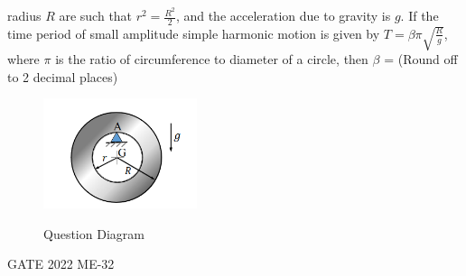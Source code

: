 \begin{enumerate}[label=\thechapter.\arabic*,ref=\thechapter.\theenumi]
radius $R$ are such that $r^2 = \frac{R^2}{2}$, and the acceleration due to gravity is $g$. If the
time period of small amplitude simple harmonic motion is given by $T = \beta \pi \sqrt{\frac{R}{g}}$,
where $\pi$ is the ratio of circumference to diameter of a circle, then $\beta$ =  (Round off to 2 decimal places)
\begin{figure}[h]
    \includegraphics[width=0.4\textwidth]{2022/ME/32/figs/11027_GATE_ME_32.png}\label{11027_GATE_ME_32}
    \caption{Question Diagram}
\end{figure}
\hfill{GATE 2022 ME-32}
\\
\solution

\end{enumerate}
